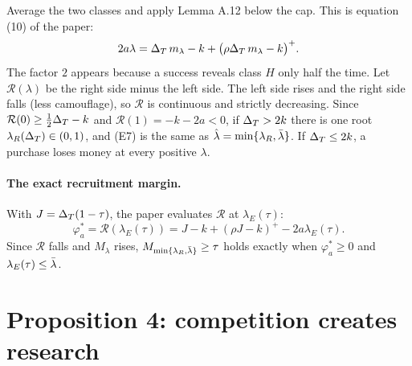 Average the two classes and apply Lemma A.12 below the cap. This is equation (10) of the paper:
\begin{equation}\label{eq:research-cond}
2a\lambda=\Delta_T\,m_\lambda-k+\bigl(\rho\Delta_T\,m_\lambda-k\bigr)^+ .
\end{equation}
The factor \(2\) appears because a success reveals class \(H\) only half the time. Let \(\mathcal R(\lambda)\) be the
right side minus the left side. The left side rises and the right side falls (less camouflage), so \(\mathcal R\) is
continuous and strictly decreasing. Since \(\mathcal R(0)\ge\tfrac12\Delta_T-k\) and \(\mathcal R(1)=-k-2a<0\), if \(\Delta_T>2k\) there is one root
\(\lambda_R(\Delta_T)\in(0,1)\), and (E7) is the same as \(\hat\lambda=\min\{\lambda_R,\bar\lambda\}\). If \(\Delta_T\le2k\), a purchase loses
money at every positive \(\lambda\).

\paragraph{The exact recruitment margin.} With \(J=\Delta_T(1-\tau)\), the paper evaluates \(\mathcal R\) at
\(\lambda_E(\tau)\):
\begin{equation}\label{eq:research-margin}
\varphi_a^*=\mathcal R(\lambda_E(\tau))=J-k+(\rho J-k)^+-2a\lambda_E(\tau).
\end{equation}
Since \(\mathcal R\) falls and \(M_\lambda\) rises, \(M_{\min\{\lambda_R,\bar\lambda\}}\ge\tau\) holds exactly when
\(\varphi_a^*\ge0\) and \(\lambda_E(\tau)\le\bar\lambda\).

\section{Proposition 4: competition creates research}\label{sec:research-prop4}

